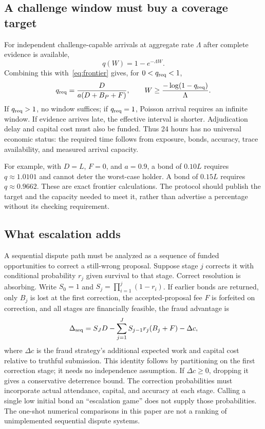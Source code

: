 \documentclass[10pt]{article}
\begin{document}
\subsection{A challenge window must buy a coverage target}

For independent challenge-capable arrivals at aggregate rate $\Lambda$ after complete evidence is available,
\[
q(W)=1-e^{-\Lambda W}.
\]
Combining this with~\eqref{eq:frontier} gives, for $0<q_{\rm req}<1$,
\begin{equation}
q_{\rm req}=\frac{D}{a(D+B_P+F)},\qquad
W\geq\frac{-\log(1-q_{\rm req})}{\Lambda}.
\label{eq:window}
\end{equation}
If $q_{\rm req}>1$, no window suffices; if $q_{\rm req}=1$, Poisson arrival requires an infinite window. If evidence arrives late, the effective interval is shorter. Adjudication delay and capital cost must also be funded. Thus 24 hours has no universal economic status: the required time follows from exposure, bonds, accuracy, trace availability, and measured arrival capacity.

For example, with $D=L$, $F=0$, and $a=0.9$, a bond of $0.10L$ requires $q\approx1.0101$ and cannot deter the worst-case holder. A bond of $0.15L$ requires $q\approx0.9662$. These are exact frontier calculations. The protocol should publish the target and the capacity needed to meet it, rather than advertise a percentage without its checking requirement.

\subsection{What escalation adds}

A sequential dispute path must be analyzed as a sequence of funded opportunities to correct a still-wrong proposal. Suppose stage $j$ corrects it with conditional probability $r_j$ given survival to that stage. Correct resolution is absorbing. Write $S_0=1$ and $S_j=\prod_{i=1}^{j}(1-r_i)$. If earlier bonds are returned, only $B_j$ is lost at the first correction, the accepted-proposal fee $F$ is forfeited on correction, and all stages are financially feasible, the fraud advantage is
\[
\Delta_{\rm seq}=S_JD-\sum_{j=1}^{J}S_{j-1}r_j(B_j+F)-\Delta c,
\]
where $\Delta c$ is the fraud strategy's additional expected work and capital cost relative to truthful submission. This identity follows by partitioning on the first correction stage; it needs no independence assumption. If $\Delta c\geq0$, dropping it gives a conservative deterrence bound. The correction probabilities must incorporate actual attendance, capital, and accuracy at each stage. Calling a single low initial bond an ``escalation game'' does not supply those probabilities. The one-shot numerical comparisons in this paper are not a ranking of unimplemented sequential dispute systems.
\end{document}
